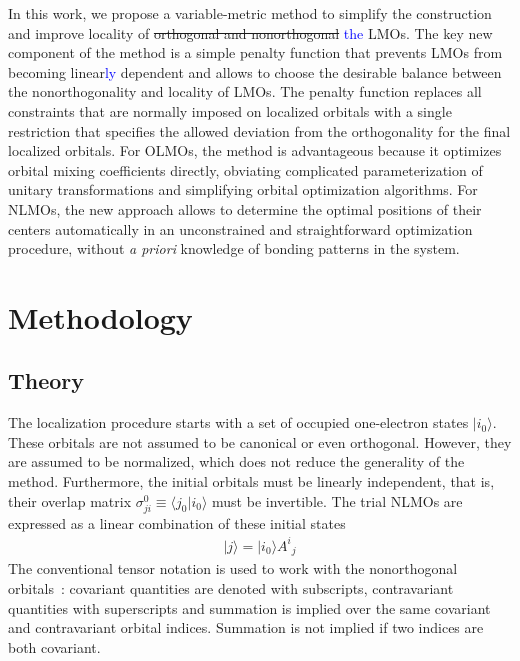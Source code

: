 \documentclass[aps,prl,reprint,amsmath,amssymb]{revtex4-1}
\newcommand{\ket}[1]{\ensuremath{\vert #1 \rangle}}
\newcommand{\braket}[2]{\ensuremath{\langle #1 \vert #2 \rangle}} %
\begin{document}
In this work, we propose a variable-metric method to simplify the construction and improve locality of \st{orthogonal and nonorthogonal} \textcolor{blue}{the} LMOs. 
The key new component of the method is a simple penalty function that prevents LMOs from becoming linear\textcolor{blue}{ly} dependent and allows to choose the desirable balance between the nonorthogonality and locality of LMOs. 
The penalty function replaces all constraints that are normally imposed on localized orbitals with a single restriction that specifies the allowed deviation from the orthogonality for the final localized orbitals. 
For \mbox{OLMOs}, the method is advantageous because it optimizes orbital mixing coefficients directly, obviating complicated parameterization of unitary transformations and simplifying orbital optimization algorithms.  
For \mbox{NLMOs}, the new approach allows to determine the optimal positions of their centers automatically in an unconstrained and straightforward optimization procedure, without \emph{a priori} knowledge of bonding patterns in the system.


\section{Methodology}

\subsection{Theory}

The localization procedure starts with a set of occupied one-electron states $\ket{i_0}$. 
These orbitals are not assumed to be canonical or even orthogonal. 
However, they are assumed to be normalized, which does not reduce the generality of the method. 
Furthermore, the initial orbitals must be linearly independent, that is, their overlap matrix $\sigma_{ji}^0 \equiv \braket{j_0}{i_0}$ must be invertible. 
The trial NLMOs are expressed as a linear combination of these initial states
%
\begin{equation}
\begin{split}
\ket{j} = \ket{i_0} {A^i}_j  
\end{split}
\end{equation}
%
The conventional tensor notation is used to work with the nonorthogonal orbitals~\cite{head1998tensor}: covariant quantities are denoted with subscripts, contravariant quantities with superscripts and summation is implied over the same covariant and contravariant orbital indices. Summation is not implied if two indices are both covariant. 
\end{document}
